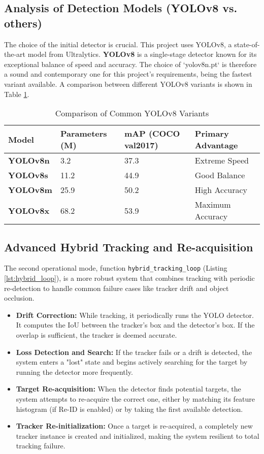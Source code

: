 \documentclass[12pt, a4paper]{article}
\begin{document}
\subsection{Analysis of Detection Models (YOLOv8 vs. others)}
The choice of the initial detector is crucial. This project uses YOLOv8, a state-of-the-art model from Ultralytics. \textbf{YOLOv8} is a single-stage detector known for its exceptional balance of speed and accuracy. The choice of `yolov8n.pt` is therefore a sound and contemporary one for this project's requirements, being the fastest variant available. A comparison between different YOLOv8 variants is shown in Table \ref{tab:yolo_comparison}.

\begin{table}[H]
\centering
\caption{Comparison of Common YOLOv8 Variants}
\label{tab:yolo_comparison}
\begin{tabular}{@{}llll@{}}
\toprule
\textbf{Model} & \textbf{Parameters (M)} & \textbf{mAP (COCO val2017)} & \textbf{Primary Advantage} \\ \midrule
\textbf{YOLOv8n} & 3.2 & 37.3 & Extreme Speed \\
\textbf{YOLOv8s} & 11.2 & 44.9 & Good Balance \\
\textbf{YOLOv8m} & 25.9 & 50.2 & High Accuracy \\
\textbf{YOLOv8x} & 68.2 & 53.9 & Maximum Accuracy \\ \bottomrule
\end{tabular}
\end{table}

\subsection{Advanced Hybrid Tracking and Re-acquisition}
The second operational mode, function \texttt{hybrid\_tracking\_loop} (Listing \ref{lst:hybrid_loop}), is a more robust system that combines tracking with periodic re-detection to handle common failure cases like tracker drift and object occlusion.
\begin{itemize}
    \item \textbf{Drift Correction:} While tracking, it periodically runs the YOLO detector. It computes the IoU between the tracker's box and the detector's box. If the overlap is sufficient, the tracker is deemed accurate.
    \item \textbf{Loss Detection and Search:} If the tracker fails or a drift is detected, the system enters a "lost" state and begins actively searching for the target by running the detector more frequently.
    \item \textbf{Target Re-acquisition:} When the detector finds potential targets, the system attempts to re-acquire the correct one, either by matching its feature histogram (if Re-ID is enabled) or by taking the first available detection.
    \item \textbf{Tracker Re-initialization:} Once a target is re-acquired, a completely new tracker instance is created and initialized, making the system resilient to total tracking failure.
\end{itemize}
\end{document}
